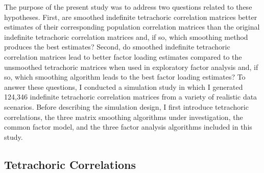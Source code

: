 \documentclass[
  english,
  man]{apa6}
\begin{document}
The purpose of the present study was to address two questions related to these hypotheses. First, are smoothed indefinite tetrachoric correlation matrices better estimates of their corresponding population correlation matrices than the original indefinite tetrachoric correlation matrices and, if so, which smoothing method produces the best estimates? Second, do smoothed indefinite tetrachoric correlation matrices lead to better factor loading estimates compared to the unsmoothed tetrachoric matrices when used in exploratory factor analysis and, if so, which smoothing algorithm leads to the best factor loading estimates? To answer these questions, I conducted a simulation study in which I generated 124,346 indefinite tetrachoric correlation matrices from a variety of realistic data scenarios. Before describing the simulation design, I first introduce tetrachoric correlations, the three matrix smoothing algorithms under investigation, the common factor model, and the three factor analysis algorithms included in this study.

\hypertarget{tetrachoric-correlations}{%
\subsection{Tetrachoric Correlations}\label{tetrachoric-correlations}}
\end{document}

